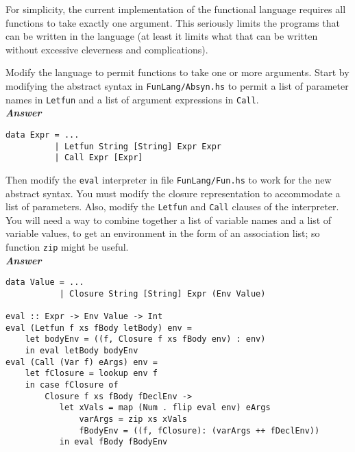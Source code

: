 \documentclass[a4paper]{article}
\begin{document}
\begin{exercise}\label{exer-fun-multiple-arguments}
  For simplicity, the current implementation of the functional
  language requires all functions to take exactly one argument.  This
  seriously limits the programs that can be written in the language
  (at least it limits what that can be written without excessive
  cleverness and complications).
  
  Modify the language to permit functions to take one or more
  arguments.  Start by modifying the abstract syntax in
  \texttt{FunLang/Absyn.hs} to permit a list of parameter names in
  \texttt{Letfun} and a list of argument expressions in
  \texttt{Call}\@.  \\
  
  
\noindent
\textbf{\emph{Answer}} 
{\codesetup\begin{verbatim}
data Expr = ...
          | Letfun String [String] Expr Expr
          | Call Expr [Expr]
\end{verbatim}} 

  
  Then modify the \texttt{eval} interpreter in file
  \texttt{FunLang/Fun.hs} to work for the new abstract syntax.  You must
  modify the closure representation to accommodate a list of
  parameters.  Also, modify the \texttt{Letfun} and \texttt{Call}
  clauses of the interpreter.  You will need a way to combine together a
  list of variable names and a list of variable values, to get an
  environment in the form of an association list; so function
  \texttt{zip} might be useful.\\
  
  
\noindent
\textbf{\emph{Answer}} 
{\codesetup\begin{verbatim}
data Value = ...
           | Closure String [String] Expr (Env Value)
           
eval :: Expr -> Env Value -> Int
eval (Letfun f xs fBody letBody) env =
    let bodyEnv = ((f, Closure f xs fBody env) : env)
    in eval letBody bodyEnv
eval (Call (Var f) eArgs) env = 
    let fClosure = lookup env f
    in case fClosure of 
        Closure f xs fBody fDeclEnv ->
           let xVals = map (Num . flip eval env) eArgs
               varArgs = zip xs xVals
               fBodyEnv = ((f, fClosure): (varArgs ++ fDeclEnv))
           in eval fBody fBodyEnv
\end{verbatim}} 

  
\end{exercise}
\end{document}
